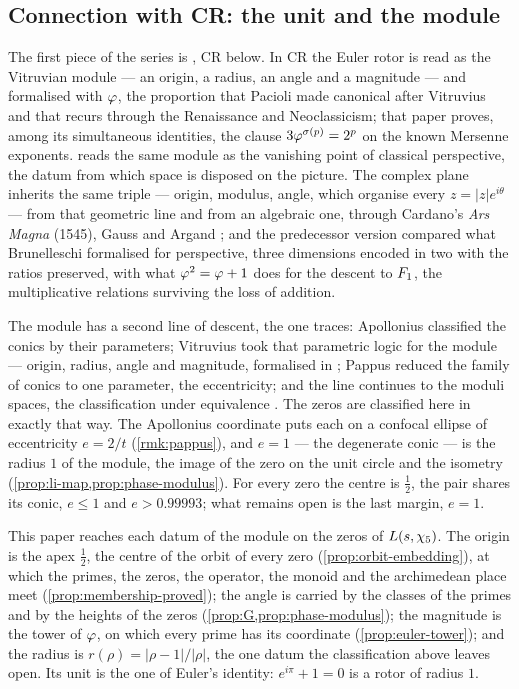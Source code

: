 \subsection{Connection with CR: the unit and the module}\label{sec:disc-cr}

The first piece of the series is \cite{gonzalez26mersenne}, CR below.  In CR the Euler rotor is read
as the Vitruvian module --- an origin, a radius, an angle and a magnitude
--- and formalised with $\varphi$, the
proportion that Pacioli made canonical \cite{pacioli1509} after Vitruvius
\cite{vitruvius} and that recurs through the Renaissance and Neoclassicism; that paper
proves, among its simultaneous identities, the clause $3\varphi^{\sigma(p)}=2^p$ on the
known Mersenne exponents.  \cite[\S1.7.2]{gonzalez26cw} reads the same module as the vanishing point of classical
perspective, the datum from which space is disposed on the picture.  The complex plane inherits the same
triple --- origin, modulus, angle, which organise every $z=|z|e^{i\theta}$ --- from that geometric line and
from an algebraic one, through Cardano's \emph{Ars Magna} (1545), Gauss and Argand \cite{argand1806}; and the
predecessor version \cite{gonzalez26oddzeta} compared what Brunelleschi formalised for perspective, three
dimensions encoded in two with the ratios preserved, with what $\varphi^2=\varphi+1$ does for the descent to
$F_1$, the multiplicative relations surviving the loss of addition.

The module has a second line of descent, the one \cite{gonzalez25hp} traces: Apollonius classified
the conics by their parameters; Vitruvius took that parametric logic for the module --- origin,
radius, angle and magnitude, formalised in \cite{gonzalez26mersenne}; Pappus reduced the family of
conics to one parameter, the eccentricity; and the line continues to the moduli spaces, the
classification under equivalence \cite{gonzalez26cw}.  The zeros are classified here in exactly that
way.  The Apollonius coordinate puts each on a confocal ellipse of eccentricity $e=2/t$
(\cref{rmk:pappus}), and $e=1$ --- the degenerate conic --- is the radius $1$ of the module, the image
of the zero on the unit circle and the isometry (\cref{prop:li-map,prop:phase-modulus}).  For every
zero the centre is $\tfrac12$, the pair shares its conic, $e\le1$ and $e>0.99993$; what remains open is
the last margin, $e=1$.

This paper reaches each datum of the module on the zeros of $L(s,\chi_5)$.  The origin is the apex
$\tfrac12$, the centre of the orbit of every zero (\cref{prop:orbit-embedding}), at which the primes, the zeros,
the operator, the monoid and the archimedean place meet (\cref{prop:membership-proved}); the angle is carried
by the classes of the primes and by the heights of the zeros (\cref{prop:G,prop:phase-modulus}); the
magnitude is the tower of $\varphi$, on which every prime has its coordinate (\cref{prop:euler-tower}); and
the radius is $r(\rho)=|\rho-1|/|\rho|$, the one datum the classification above leaves open.  Its unit
is the one of Euler's identity: $e^{i\pi}+1=0$ is a rotor of radius $1$.

